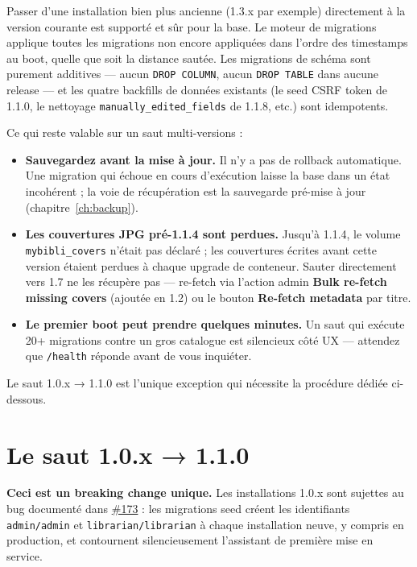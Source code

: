 Passer d'une installation bien plus ancienne (1.3.x par exemple)
directement à la version courante est supporté et sûr pour la
base. Le moteur de migrations applique toutes les migrations
non encore appliquées dans l'ordre des timestamps au boot,
quelle que soit la distance sautée. Les migrations de schéma
sont purement additives — aucun \texttt{DROP COLUMN}, aucun
\texttt{DROP TABLE} dans aucune release — et les quatre
backfills de données existants (le seed CSRF token de 1.1.0,
le nettoyage \texttt{manually\_edited\_fields} de 1.1.8, etc.)
sont idempotents.

Ce qui reste valable sur un saut multi-versions :

\begin{itemize}
  \item \textbf{Sauvegardez avant la mise à jour.} Il n'y a pas
        de rollback automatique. Une migration qui échoue en
        cours d'exécution laisse la base dans un état
        incohérent ; la voie de récupération est la sauvegarde
        pré-mise à jour (chapitre~\ref{ch:backup}).
  \item \textbf{Les couvertures JPG pré-1.1.4 sont perdues.}
        Jusqu'à 1.1.4, le volume \texttt{mybibli\_covers}
        n'était pas déclaré ; les couvertures écrites avant
        cette version étaient perdues à chaque upgrade de
        conteneur. Sauter directement vers 1.7 ne les récupère
        pas — re-fetch via l'action admin \textbf{Bulk re-fetch
        missing covers} (ajoutée en 1.2) ou le bouton
        \textbf{Re-fetch metadata} par titre.
  \item \textbf{Le premier boot peut prendre quelques minutes.}
        Un saut qui exécute 20+ migrations contre un gros
        catalogue est silencieux côté UX — attendez que
        \texttt{/health} réponde avant de vous inquiéter.
\end{itemize}

Le saut 1.0.x → 1.1.0 est l'unique exception qui nécessite la
procédure dédiée ci-dessous.

\section{Le saut 1.0.x → 1.1.0}\label{sec:upgrade-1.1.0}

\begin{warning}
\textbf{Ceci est un breaking change unique.}
Les installations 1.0.x sont sujettes au bug documenté dans
\href{https://github.com/guycorbaz/mybibli/issues/173}{\#173} :
les migrations seed créent les identifiants \texttt{admin/admin}
et \texttt{librarian/librarian} à chaque installation neuve, y
compris en production, et contournent silencieusement l'assistant
de première mise en service.
\end{warning}

